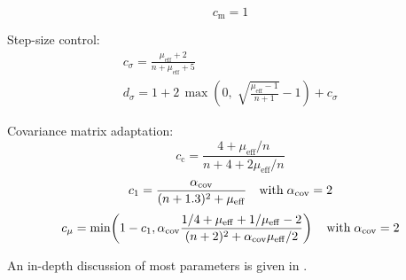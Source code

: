 \documentclass{article} %
\newcommand{\mueff}{\ensuremath{\mu_\mathrm{eff}}}
\newcommand{\sumw}[1][j]{\ensuremath{{\textstyle\sum{\!w_{#1}}}}}
\newcommand{\mucov}{\mu_\mathrm{cov}}
\newcommand{\alphamuminus}{\ensuremath{\alpha_{\mu}^{-}}}
\newcommand{\summ}[2]{\sum_{#1=1}^{#2}}
\newcommand{\lam}{\ensuremath{\lambda}}
\newcommand{\sig}{\ensuremath{\sigma}}
\newcommand{\cc}{\ensuremath{c_\mathrm{c}}}
\newcommand{\cs}{c_\sig}
\newcommand{\ds}{d_\sig}
\newcommand{\cm}{\ensuremath{c_\mathrm{m}}}%
\newcommand{\cone}{\ensuremath{c_1}}
\newcommand{\cmu}{\ensuremath{c_\mu}}
\begin{document}
\begin{appendix}
\begin{table}
{{\begin{eqnarray}
\end{eqnarray}
%
\begin{equation}
\cm = 1
\end{equation}

Step-size control:
\begin{equation}\label{eq-def-sig}
\begin{array}{l}
\displaystyle
\cs= \frac{\mueff+2}{n+\mueff+5}\\
\displaystyle
\ds = 1 + 2\,\max\left(0,\;\sqrt{\frac{\mueff-1}{n+1}}-1\right) + \cs
\end{array}
\end{equation}

Covariance matrix adaptation:
\begin{equation}
\cc=\frac{4 + \mueff/n}{n+4+2\mueff/n}
\label{eq-def-cc}
\end{equation}
\begin{equation}
\cone = \frac{\alphacov}{(n+1.3)^2 + \mueff}  %
                    \quad \text{with}\;\alphacov = 2
\label{eq-def-cone}
\end{equation}
\begin{equation}\label{eq-def-cmu}
\cmu{}=
   \min\!\left(1-\cone,\alphacov\frac{
                                       1/4 + \mueff + 1/\mueff - 2
                    }{(n+2)^2+\alphacov\mueff/2}\right) 
                    \quad \text{with}\;\alphacov = 2
\end{equation}
}}
\end{table}%
%
An in-depth discussion of most parameters is given in
\cite{Hansen:2001}. 
  

\end{appendix}
\end{document}
